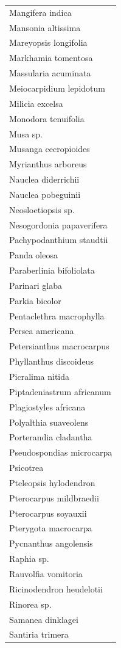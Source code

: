 \documentclass[
  12pt,
  a4paper,
  extrafontsizes,
  onecolumn,
  openright]{book}
\theoremstyle{definition}
\theoremstyle{definition}
\theoremstyle{definition}
\theoremstyle{definition}
\theoremstyle{remark}
\begin{document}
\begin{longtable}[]{@{}l@{}}
Mangifera indica \\
Mansonia altissima \\
Mareyopsis longifolia \\
Markhamia tomentosa \\
Massularia acuminata \\
Meiocarpidium lepidotum \\
Milicia excelsa \\
Monodora tenuifolia \\
Musa sp. \\
Musanga cecropioides \\
Myrianthus arboreus \\
Nauclea diderrichii \\
Nauclea pobeguinii \\
Neosloetiopsis sp. \\
Nesogordonia papaverifera \\
Pachypodanthium staudtii \\
Panda oleosa \\
Paraberlinia bifoliolata \\
Parinari glaba \\
Parkia bicolor \\
Pentaclethra macrophylla \\
Persea americana \\
Petersianthus macrocarpus \\
Phyllanthus discoideus \\
Picralima nitida \\
Piptadeniastrum africanum \\
Plagiostyles africana \\
Polyalthia suaveolens \\
Porterandia cladantha \\
Pseudospondias microcarpa \\
Psicotrea \\
Pteleopsis hylodendron \\
Pterocarpus mildbraedii \\
Pterocarpus soyauxii \\
Pterygota macrocarpa \\
Pycnanthus angolensis \\
Raphia sp. \\
Rauvolfia vomitoria \\
Ricinodendron heudelotii \\
Rinorea sp. \\
Samanea dinklagei \\
Santiria trimera \\

\end{longtable}
\end{document}
